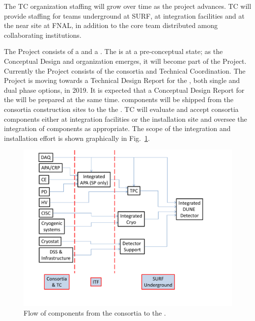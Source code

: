 The TC organization staffing will grow over time as the project
advances. TC will provide staffing for teams underground at SURF, at
integration facilities and at the near site at FNAL, in addition to
the core team distributed among collaborating institutions.

The  Project consists of a  and a
. The  is at a pre-conceptual state; as the
Conceptual Design and organization emerges, it will become part of the
 Project. Currently the  Project consists of
the   consortia and Technical Coordination.  The
 Project is moving towards a Technical Design Report for
the , both single and dual phase options, in 2019. It is
expected that a Conceptual Design Report for the  will be
prepared at the same time.  components will be shipped
from the consortia construction sites to the the . TC will
evaluate and accept consortia components either at integration
facilities or the installation site and oversee the integration of
components as appropriate. The scope of the  integration
and installation effort is shown graphically in
Fig.~\ref{fig:TC_flow}.
\begin{figure}[htb]
  \begin{center}
    \includegraphics[width=\textwidth]{far-detector-generic/figures/DUNE_deliverable_flow}
    \caption{Flow of components from the consortia to the .}
    \label{fig:TC_flow}
  \end{center}
\end{figure}

